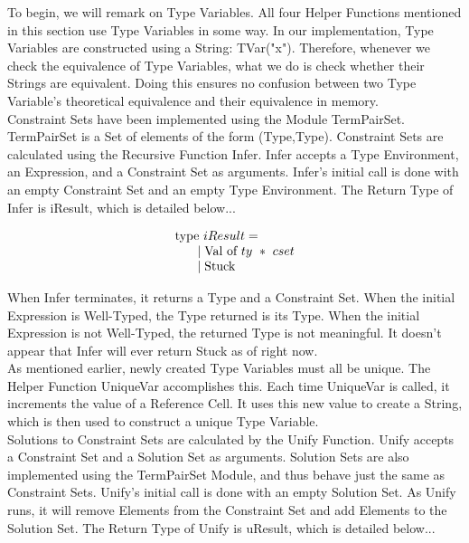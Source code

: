 \documentclass{article}
\begin{document}
To begin, we will remark on Type Variables. All four Helper Functions mentioned in this section use Type Variables in some way. In our implementation, Type Variables are constructed using a String: TVar("x"). Therefore, whenever we check the equivalence of Type Variables, what we do is check whether their Strings are equivalent. Doing this ensures no confusion between two Type Variable's theoretical equivalence and their equivalence in memory.\\

Constraint Sets have been implemented using the Module TermPairSet. TermPairSet is a Set of elements of the form (Type,Type). Constraint Sets are calculated using the Recursive Function Infer. Infer accepts a Type Environment, an Expression, and a Constraint Set as arguments. Infer's initial call is done with an empty Constraint Set and an empty Type Environment. The Return Type of Infer is iResult, which is detailed below...

\begin{equation}
    \begin{array}{l}
    \text{type} \ iResult = \\
    \indent \mid \text{Val of} \ ty \ * \ cset \\
    \indent \mid \text{Stuck}
    \end{array}
\end{equation}

When Infer terminates, it returns a Type and a Constraint Set. When the initial Expression is Well-Typed, the Type returned is its Type. When the initial Expression is not Well-Typed, the returned Type is not meaningful. It doesn't appear that Infer will ever return Stuck as of right now.\\

As mentioned earlier, newly created Type Variables must all be unique. The Helper Function UniqueVar accomplishes this. Each time UniqueVar is called, it increments the value of a Reference Cell. It uses this new value to create a String, which is then used to construct a unique Type Variable. \\

Solutions to Constraint Sets are calculated by the Unify Function. Unify accepts a Constraint Set and a Solution Set as arguments. Solution Sets are also implemented using the TermPairSet Module, and thus behave just the same as Constraint Sets. Unify's initial call is done with an empty Solution Set. As Unify runs, it will remove Elements from the Constraint Set and add Elements to the Solution Set. The Return Type of Unify is uResult, which is detailed below...
\end{document}
